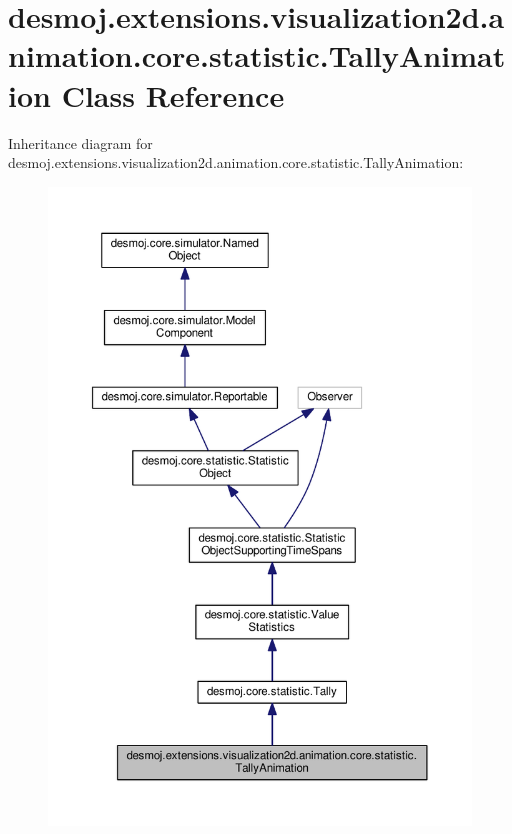 \section{desmoj.\-extensions.\-visualization2d.\-animation.\-core.\-statistic.\-Tally\-Animation Class Reference}
\label{classdesmoj_1_1extensions_1_1visualization2d_1_1animation_1_1core_1_1statistic_1_1_tally_animation}


Inheritance diagram for desmoj.\-extensions.\-visualization2d.\-animation.\-core.\-statistic.\-Tally\-Animation\-:
\nopagebreak
\begin{figure}[H]
\begin{center}
\leavevmode
\includegraphics[width=350pt]{classdesmoj_1_1extensions_1_1visualization2d_1_1animation_1_1core_1_1statistic_1_1_tally_animation__inherit__graph}
\end{center}
\end{figure}


